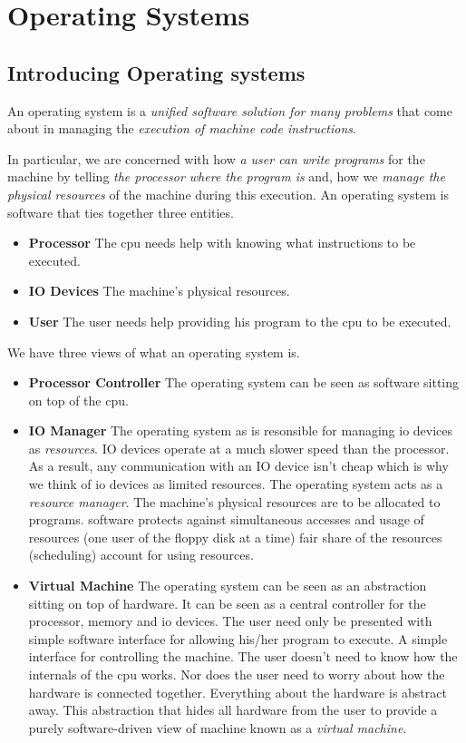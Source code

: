 
\chapter{Operating Systems}


\section{Introducing Operating systems}

An operating system is a \textit{unified software solution for many problems} 
that come about in managing the \textit{execution of machine code instructions}.

In particular, we are concerned with how \textit{a user can write programs} for the machine 
by telling \textit{the processor where the program is} and, how we \textit{manage the
physical resources} of the machine during this execution.  
An operating system is software that ties together three entities. 

\begin{itemize}   
\renewcommand{\labelitemi}{$\Box$}
\item \textbf{Processor} 
The cpu needs help with knowing what instructions to be executed.
\item \textbf{IO Devices} 
The machine's physical resources.
\item \textbf{User} 
The user needs help providing his program to the cpu to be executed.
\end{itemize}

We have three views of what an operating system is.

\begin{itemize}   
\renewcommand{\labelitemi}{$\Box$}
\item \textbf{Processor Controller} 
The operating system can be seen as software sitting on top of the cpu.
\item \textbf{IO Manager}
The operating system as is resonsible for managing io devices as \textit{resources}.
IO devices operate at a much slower speed than the processor. As a result, 
any communication with an IO device isn't cheap which is why we think of io devices 
as limited resources.
The operating system acts as a \textit{resource manager}. 
The machine's physical resources are to be allocated to programs. 
software protects against simultaneous accesses
and usage of resources (one user of the ﬂoppy disk at a time)
fair share of the resources (scheduling) account for using resources.
\item \textbf{Virtual Machine} 
The operating system can be seen as an abstraction sitting on top of hardware. 
It can be seen as a central controller for the processor, memory and io devices.
The user need only be presented with simple software interface for 
allowing his/her program to execute. A simple interface for controlling the machine.
The user doesn't need to know how the internals of the cpu works. 
Nor does the user need to worry about how the hardware is connected together. 
Everything about the hardware is abstract away. 
This abstraction that hides all hardware from the user to provide a 
purely software-driven view of machine known as a \textit{virtual machine}.
\end{itemize}

